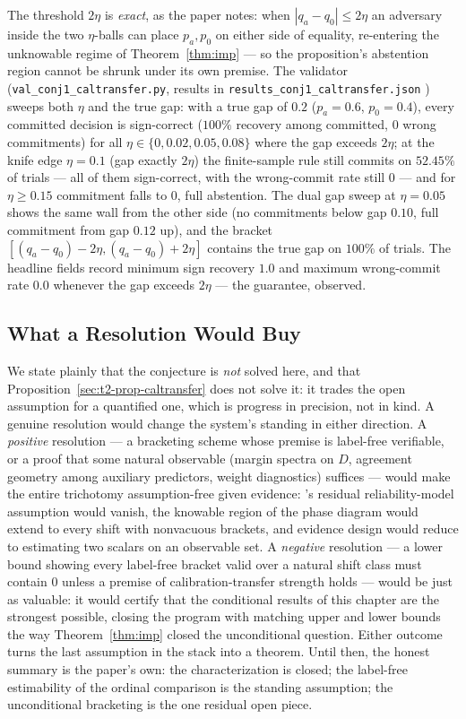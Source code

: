The threshold $2\eta$ is \emph{exact}, as the paper notes: when $|q_a-q_0|\le2\eta$ an
adversary inside the two $\eta$-balls can place $p_a,p_0$ on either side of equality,
re-entering the unknowable regime of Theorem~\ref{thm:imp} --- so the proposition's
abstention region cannot be shrunk under its own premise. The validator
(\texttt{val\_conj1\_caltransfer.py}, results in
\texttt{results\_conj1\_caltransfer.json} \cite{kbound2026repo}) sweeps both $\eta$ and
the true gap: with a true gap of $0.2$ ($p_a=0.6$, $p_0=0.4$), every committed decision
is sign-correct ($100\%$ recovery among committed, $0$ wrong commitments) for all
$\eta\in\{0,0.02,0.05,0.08\}$ where the gap exceeds $2\eta$; at the knife edge
$\eta=0.1$ (gap exactly $2\eta$) the finite-sample rule still commits on $52.45\%$ of
trials --- all of them sign-correct, with the wrong-commit rate still $0$ --- and for
$\eta\ge0.15$ commitment falls to $0$, full abstention. The dual gap sweep at
$\eta=0.05$ shows the same wall from the other side (no commitments below gap $0.10$,
full commitment from gap $0.12$ up), and the bracket
$[(q_a-q_0)-2\eta,(q_a-q_0)+2\eta]$ contains the true gap on $100\%$ of trials. The
headline fields record minimum sign recovery $1.0$ and maximum wrong-commit rate $0.0$
whenever the gap exceeds $2\eta$ --- the guarantee, observed.

\subsection{What a Resolution Would Buy}
\label{sec:t2-open-payoff}

We state plainly that the conjecture is \emph{not} solved here, and that
Proposition~\ref{sec:t2-prop-caltransfer} does not solve it: it trades the open
assumption for a quantified one, which is progress in precision, not in kind. A
genuine resolution would change the system's standing in either direction. A
\emph{positive} resolution --- a bracketing scheme whose premise is label-free
verifiable, or a proof that some natural observable (margin spectra on $D$, agreement
geometry among auxiliary predictors, weight diagnostics) suffices --- would make the
entire trichotomy assumption-free given evidence: \KGA's residual reliability-model
assumption would vanish, the knowable region of the phase diagram would extend to
every shift with nonvacuous brackets, and evidence design would reduce to estimating
two scalars on an observable set. A \emph{negative} resolution --- a lower bound
showing every label-free bracket valid over a natural shift class must contain $0$
unless a premise of calibration-transfer strength holds --- would be just as valuable:
it would certify that the conditional results of this chapter are the strongest
possible, closing the program with matching upper and lower bounds the way
Theorem~\ref{thm:imp} closed the unconditional question. Either outcome turns the last
assumption in the stack into a theorem. Until then, the honest summary is the paper's
own: the characterization is closed; the label-free estimability of the ordinal
comparison is the standing assumption; the unconditional bracketing is the one residual
open piece.

